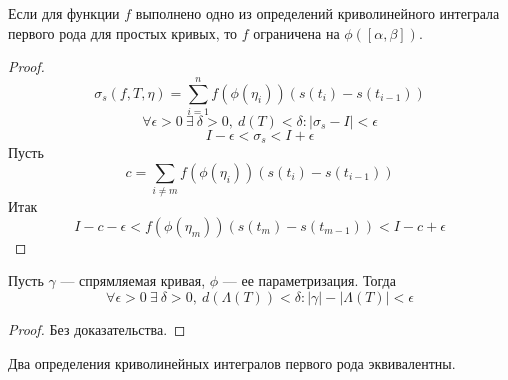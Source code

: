 \begin{lemma}
    Если для функции $f$ выполнено одно из определений криволинейного интеграла первого рода для простых кривых, то $f$ ограничена на $\phi([\alpha,\beta])$.
\end{lemma}
\begin{proof}
    \[\sigma_{s}(f,T,\eta)=\sum\limits_{i=1}^{n}f(\phi(\eta_i))(s(t_i)-s(t_{i-1}))\]
\[\forall \epsilon>0\ \exists\ \delta>0,\ d(T)<\delta: |\sigma_s-I|<\epsilon\]
\[I-\epsilon<\sigma_s<I+\epsilon\]
Пусть
\[c=\sum\limits_{i\neq m}f(\phi(\eta_i))(s(t_i)-s(t_{i-1}))\]
Итак
\[I-c-\epsilon<f(\phi(\eta_m))(s(t_m)-s(t_{m-1}))<I-c+\epsilon\]
\end{proof}
\begin{lemma}
    Пусть $\gamma$ --- спрямляемая кривая, $\phi$ --- ее параметризация. Тогда 
    \[\forall \epsilon>0\ \exists\ \delta>0,\ d(\Lambda(T))<\delta: |\gamma|-|\Lambda(T)|<\epsilon\]
\end{lemma}
\begin{proof} Без доказательства.
\end{proof}
\begin{theorem}
    Два определения криволинейных интегралов первого рода эквивалентны.
\end{theorem}
